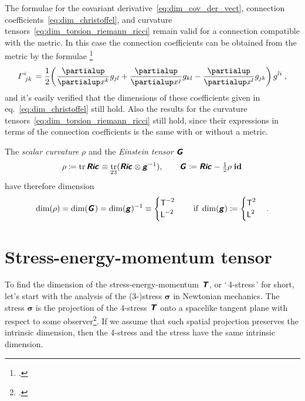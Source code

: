 \documentclass[\ifafour a4paper,12pt,\else a5paper,10pt,\fi%
onecolumn,oneside,article,%
british%
]{memoir}
\makeatletter
\newcommand*{\defquote}[1]{`\,#1\,'}
\theoremstyle{remark}
\theoremstyle{innote}
\newcommand*{\mathte}[1]{\textbf{\textit{\textsf{#1}}}}
\newcommand*{\citep}{\footcites}
\newcommand*{\de}{\partialup}%
\DeclareMathOperator{\tr}{tr}%
\newcommand*{\defd}{\coloneqq}
\renewcommand*{\|}[1][]{\nonscript\,#1\vert\nonscript\;\mathopen{}}
\newcommand*{\sect}{\S}%
\newcommand*{\eqn}{eq.}%
\newcommand*{\q}{}%
\DeclareRobustCommand*{\q}{%
  \mathbin{\mathpalette\bigcdot@{}}%
}
\newcommand*{\bigcdot@scalefactor}{0.7}
\newcommand*{\bigcdot@widthfactor}{1.5}
\newcommand*{\bigcdot@}[2]{%
  \sbox0{$#1\vcenter{}$}%
  \sbox2{$#1\cdot\m@th$}%
  \hbox to \bigcdot@widthfactor\wd2{%
    \hfil
    \raise\ht0\hbox{%
      \scalebox{\bigcdot@scalefactor}{%
        \lower\ht0\hbox{$#1\bullet\m@th$}%
      }%
    }%
    \hfil
  }%
}
\newcommand*{\Le}{\textsf{L}}
\newcommand*{\Ti}{\textsf{T}}
\newcommand*{\yg}{\mathte{g}}
\newcommand*{\yT}{\mathte{T}}
\newcommand*{\yG}{\mathte{G}}
\newcommand*{\yRi}{\mathte{Ric}}
\newcommand*{\ysc}{\rho}
\renewcommand*{\i}{\indices}
\newcommand*{\dex}[1][i]{\frac{\de}{\de x^{#1}}}
\newcommand*{\yGa}{\varGamma}
\newcommand*{\id}{\mathbf{id}}%
\newcommand*{\yt}{\bm{\sigma}}
\makeatother
\begin{document}
\medskip

The formulae for the covariant derivative~\eqref{eq:dim_cov_der_vect},
connection coefficients~\eqref{eq:dim_christoffel}, and curvature
tensors~\eqref{eq:dim_torsion_riemann_ricci} remain valid for a connection
compatible with the metric. In this case the connection coefficients can be
obtained from the metric by the formulae
\citep[\sect~V.B.2]{choquetbruhatetal1977_r1996}
\begin{equation}
  \label{eq:christoffel_g}
  \yGa\i{^{i}_{jk}} = \frac{1}{2}
  \biggl(\dex[k]g_{jl} + \dex[j]g_{kl} - \dex[l]g_{jk}\biggr)\,g^{li} \;,
\end{equation}
and it's easily verified that the dimensions of these coefficients given in
\eqn~\eqref{eq:dim_christoffel} still hold. Also the results for the
curvature tensors~\eqref{eq:dim_torsion_riemann_ricci} still hold, since
their expressions in terms of the connection coefficients is the same with
or without a metric.

\medskip

The \emph{scalar curvature} $\ysc$ and the \emph{Einstein tensor}
$\yG\i{_{\q}^{\q}}$
\begin{equation}
  \label{eq:curv_einst}
  \ysc \defd \tr\yRi\i{_{\q}^{\q}}\equiv\tr_{23}(\yRi\otimes\yg^{-1}),
  \qquad
  \yG\i{_{\q}^{\q}} \defd \yRi\i{_{\q}^{\q}} -
  \tfrac{1}{2} \ysc\;\id\i{_{\q}^{\q}} 
\end{equation}
have therefore dimension
\begin{equation}
  \label{eq:dim_curv_einst}
  \dim(\ysc) = \dim(\yG\i{_{\q}^{\q}}) =\dim(\yg)^{-1} \equiv
  \begin{cases}
    \Ti^{-2} \\
    \Le^{-2}
  \end{cases}
  \quad\text{if }\dim(\yg)\defd
  \begin{cases}
     \Ti^2 \\
    \Le^2
  \end{cases}.
\end{equation}

\section{Stress-energy-momentum tensor}
\label{sec:stressenergy}

To find the dimension of the stress-energy-momentum $\yT$, or
\defquote{4-stress} for short, let's start with the analysis of the
(3-)stress $\yt$ in Newtonian mechanics. The stress $\yt$ is the projection
of the 4-stress $\yT$ onto a spacelike tangent plane with respect to some
observer\citep[\sect~3.4.1]{gourgoulhon2007_r2012}{smarretal1978,york1979,smarretal1980}[\sect~1.3]{wilsonetal2003_r2007}[the
projection doesn't need to be
orthogonal:][\sect~2.4]{marsdenetal1994}[\sect~B.1.4]{hehletal2003}. If we
assume that such spatial projection preserves the intrinsic dimension, then
the 4-stress and the stress have the same intrinsic dimension.
\end{document}

